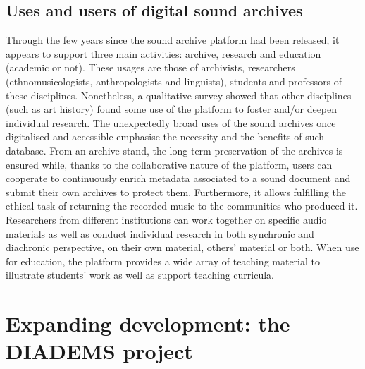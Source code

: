 \documentclass{sig-alternate}
\begin{document}
\subsection{Uses and users of digital sound archives}
     Through the few years since the sound archive platform had been released, it appears to support three main activities: archive, research and education (academic or not). These usages are those of archivists, researchers (ethnomusicologists, anthropologists and linguists), students and professors of these disciplines. Nonetheless, a qualitative survey showed that other disciplines (such as art history) found some use of the platform to foster and/or deepen individual research. The unexpectedly broad uses of the sound archives once digitalised and accessible emphasise the necessity and the benefits of such database.
From an archive stand, the long-term preservation of the archives is ensured while, thanks to the collaborative nature of the platform, users can cooperate to continuously enrich metadata associated to a sound document and submit their own archives to protect them. Furthermore, it allows fulfilling the ethical task of returning the recorded music to the communities who produced it.
Researchers from different institutions can work together on specific audio materials as well as conduct individual research in both synchronic and diachronic perspective, on their own material, others’ material or both.
When use for education, the platform provides a wide array of teaching material to illustrate students’ work as well as support teaching curricula.


\section{Expanding development: the DIADEMS project}\label{sec:Diadems}
\end{document}
